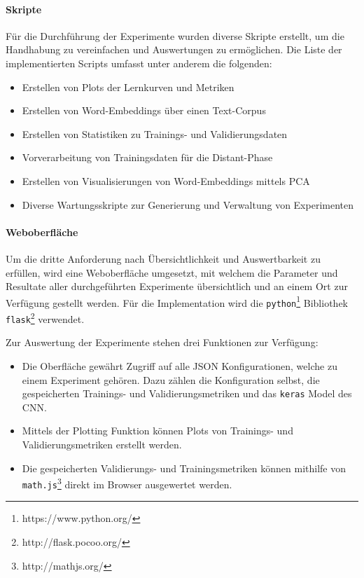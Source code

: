 \paragraph{Skripte}
\label{technical_setup:scripts}
Für die Durchführung der Experimente wurden diverse Skripte erstellt, um die Handhabung zu vereinfachen und Auswertungen zu ermöglichen. Die Liste der implementierten Scripts umfasst unter anderem die folgenden:

\begin{itemize}[noitemsep]
	\item Erstellen von Plots der Lernkurven und Metriken
	\item Erstellen von Word-Embeddings über einen Text-Corpus
	\item Erstellen von Statistiken zu Trainings- und Validierungsdaten
	\item Vorverarbeitung von Trainingsdaten für die Distant-Phase
	\item Erstellen von Visualisierungen von Word-Embeddings mittels PCA
	\item Diverse Wartungsskripte zur Generierung und Verwaltung von Experimenten
\end{itemize}

\paragraph{Weboberfläche}
\label{technical_setup:webgui}
Um die dritte Anforderung nach Übersichtlichkeit und Auswertbarkeit zu erfüllen, wird eine Weboberfläche umgesetzt, mit welchem die Parameter und Resultate aller durchgeführten Experimente übersichtlich und an einem Ort zur Verfügung gestellt werden. Für die Implementation wird die \texttt{python}\footnote{https://www.python.org/} Bibliothek \texttt{flask}\footnote{http://flask.pocoo.org/} verwendet.

Zur Auswertung der Experimente stehen drei Funktionen zur Verfügung:
\begin{itemize}
	\item Die Oberfläche gewährt Zugriff auf alle JSON Konfigurationen, welche zu einem Experiment gehören. Dazu zählen die Konfiguration selbst, die gespeicherten Trainings- und Validierungsmetriken und das \texttt{keras} Model des CNN.
	\item Mittels der Plotting Funktion können Plots von Trainings- und Validierungsmetriken erstellt werden.
	\item Die gespeicherten Validierungs- und Trainingsmetriken können mithilfe von \texttt{math.js}\footnote{http://mathjs.org/} direkt im Browser ausgewertet werden.
\end{itemize}

